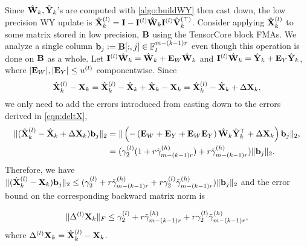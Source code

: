 Since $\hat{\mathbf{W}}_{k},\hat{\mathbf{Y}}_k$'s are computed with \cref{algo:buildWY} then cast down, the low precision WY update is $\hat{\mathbf{X}}_{k}^{(l)} = \mathbf{I}-\mathbf{I}^{(l)}\hat{\mathbf{W}}_k\mathbf{I}^{(l)}\hat{\mathbf{V}}_k^{(\top)}$.
Consider applying $\hat{\mathbf{X}}_k^{(l)}$ to some matrix stored in low precision, $\mathbf{B}$ using the TensorCore block FMAs.
We analyze a single column $\mathbf{b}_j:=\mathbf{B}[:,j] \in \mathbb{F}_l^{m-(k-1)r}$ even though this operation is done on $\mathbf{B}$ as a whole.
Let $\mathbf{I}^{(l)}\hat{\mathbf{W}}_k = \hat{\mathbf{W}}_k + \mathbf{E}_W\hat{\mathbf{W}}_k$ and $\mathbf{I}^{(l)}\hat{\mathbf{W}}_k = \hat{\mathbf{Y}}_k + \mathbf{E}_Y\hat{\mathbf{Y}}_k$, where $|\mathbf{E}_W|,|\mathbf{E}_Y| \leq u^{(l)}$ componentwise.  
Since \[\hat{\mathbf{X}}_{k}^{(l)}- \mathbf{X}_k = \hat{\mathbf{X}}_{k}^{(l)} -\hat{\mathbf{X}}_{k}+ \hat{\mathbf{X}}_{k}- \mathbf{X}_k= \hat{\mathbf{X}}_{k}^{(l)} -\hat{\mathbf{X}}_{k}+ \Delta \mathbf{X}_{k},\]
we only need to add the errors introduced from casting down to the errors derived in \cref{eqn:deltX},
\begin{align*}
	\|(\hat{\bb{X}}_{k}^{(l)}- \hat{\bb{X}}_{k}+ \Delta \bb{X}_{k})\bb{b}_j \|_2 %
	&= \| \left(-\left(\bb{E}_W+\bb{E}_Y+ \bb{E}_W\bb{E}_Y\right)\hat{\bb{W}}_k\hat{\bb{Y}}_k^{\top} + \Delta \bb{X}_{k} \right)\bb{b}_j\|_2,\\
	&= (\gamma_2^{(l)}(1+r\tilde{\gamma}_{m-(k-1)r}^{(h)}) + r\tilde{\gamma}_{m-(k-1)r}^{(h)}) \|\bb{b}_j\|_2.
\end{align*}
Therefore, we have $\|(\hat{\mathbf{X}}_k^{(l)}-\mathbf{X}_k)\mathbf{b}_j\|_2 \leq (\gamma_2^{(l)} +r\tilde{\gamma}_{m-(k-1)r}^{(h)} + r\gamma_2^{(l)}\tilde{\gamma}_{m-(k-1)r}^{(h)}) \|\mathbf{b}_j\|_2 $ and the error bound on the corresponding backward matrix norm is

\begin{equation}
	\|\Delta^{(l)}\bb{X}_k\|_F \leq \gamma_2^{(l)} +r\tilde{\gamma}_{m-(k-1)r}^{(h)} + r\gamma_2^{(l)}\tilde{\gamma}_{m-(k-1)r}^{(h)},\label{eqn:mpdeltX}
\end{equation}
where $\Delta^{(l)}\mathbf{X}_k = \hat{\mathbf{X}}_k^{(l)}-\mathbf{X}_k$.

